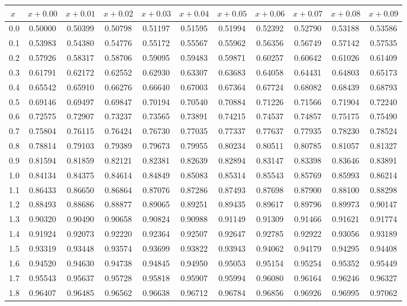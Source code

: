 
\begin{tabular}{c|cccccccccc}
$x\;$&$x\!+\!0.00$&$x\!+\!0.01$&$x\!+\!0.02$&$x\!+\!0.03$&$x\!+\!0.04$&$x\!+\!0.05$&$x\!+\!0.06$&$x\!+\!0.07$&$x\!+\!0.08$&$x\!+\!0.09$\\\hline
0.0&0.50000&0.50399&0.50798&0.51197&0.51595&0.51994&0.52392&0.52790&0.53188&0.53586\\
0.1&0.53983&0.54380&0.54776&0.55172&0.55567&0.55962&0.56356&0.56749&0.57142&0.57535\\
0.2&0.57926&0.58317&0.58706&0.59095&0.59483&0.59871&0.60257&0.60642&0.61026&0.61409\\
0.3&0.61791&0.62172&0.62552&0.62930&0.63307&0.63683&0.64058&0.64431&0.64803&0.65173\\
0.4&0.65542&0.65910&0.66276&0.66640&0.67003&0.67364&0.67724&0.68082&0.68439&0.68793\\
0.5&0.69146&0.69497&0.69847&0.70194&0.70540&0.70884&0.71226&0.71566&0.71904&0.72240\\
0.6&0.72575&0.72907&0.73237&0.73565&0.73891&0.74215&0.74537&0.74857&0.75175&0.75490\\
0.7&0.75804&0.76115&0.76424&0.76730&0.77035&0.77337&0.77637&0.77935&0.78230&0.78524\\
0.8&0.78814&0.79103&0.79389&0.79673&0.79955&0.80234&0.80511&0.80785&0.81057&0.81327\\
0.9&0.81594&0.81859&0.82121&0.82381&0.82639&0.82894&0.83147&0.83398&0.83646&0.83891\\
1.0&0.84134&0.84375&0.84614&0.84849&0.85083&0.85314&0.85543&0.85769&0.85993&0.86214\\
1.1&0.86433&0.86650&0.86864&0.87076&0.87286&0.87493&0.87698&0.87900&0.88100&0.88298\\
1.2&0.88493&0.88686&0.88877&0.89065&0.89251&0.89435&0.89617&0.89796&0.89973&0.90147\\
1.3&0.90320&0.90490&0.90658&0.90824&0.90988&0.91149&0.91309&0.91466&0.91621&0.91774\\
1.4&0.91924&0.92073&0.92220&0.92364&0.92507&0.92647&0.92785&0.92922&0.93056&0.93189\\
1.5&0.93319&0.93448&0.93574&0.93699&0.93822&0.93943&0.94062&0.94179&0.94295&0.94408\\
1.6&0.94520&0.94630&0.94738&0.94845&0.94950&0.95053&0.95154&0.95254&0.95352&0.95449\\
1.7&0.95543&0.95637&0.95728&0.95818&0.95907&0.95994&0.96080&0.96164&0.96246&0.96327\\
1.8&0.96407&0.96485&0.96562&0.96638&0.96712&0.96784&0.96856&0.96926&0.96995&0.97062\\

\end{tabular}
